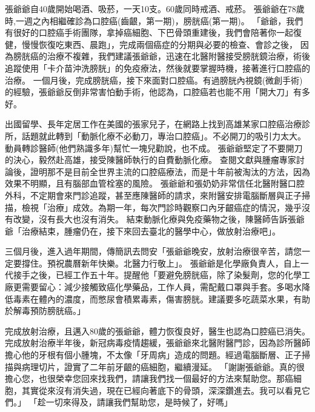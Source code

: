 \documentclass[12pt, a4paper]{article}
\begin{document}
張爺爺自40歲開始喝酒、吸菸，一天10支。60歲同時戒酒、戒菸。
張爺爺在78歲時,一週之內相繼確診為口腔癌(齒齦，第一期)，膀胱癌(第一期)。
「爺爺，我們有很好的口腔癌手術團隊，拿掉癌細胞、下巴骨頭重建後，我們會陪著你一起復健，慢慢恢復吃東西、晨跑」，完成兩個癌症的分期與必要的檢查、會診之後，
因為膀胱癌的治療不複雜，我們建議張爺爺，迅速在北醫附醫接受膀胱鏡治療，術後追蹤使用「卡介苗沖洗膀胱」的免疫療法，然後就要掌握時機，接著進行口腔癌的治療。
一個月後，完成膀胱癌，接下來面對口腔癌。有過膀胱內視鏡(微創手術)的經驗，張爺爺反倒非常害怕動手術，他認為，口腔癌若也能不用「開大刀」有多好。

出國留學、長年定居工作在美國的張家兒子，在網路上找到高雄某家口腔癌治療診所，話題就此轉到「動脈化療不必動刀，專治口腔癌」。不必開刀的吸引力太大。動員轉診醫師(他們熟識多年)幫忙一塊兒勸說，也不成。
張爺爺堅定了不要開刀的決心，毅然赴高雄，接受陳醫師執行的自費動脈化療。
查閱文獻與腫瘤專家討論後，證明那不是目前全世界主流的口腔癌療法，而是十年前被淘汰的方法，因為效果不明顯，且有腦部血管栓塞的風險。
張爺爺和張奶奶非常信任北醫附醫口腔外科，不定期會來門診追蹤，甚至應陳醫師的請求，來附醫安排電腦斷層與正子掃描，檢視「治療」成效。為期一年，每次門診時觀察口內牙齦癌症的情況，幾乎沒有改變，沒有長大也沒有消失。
結束動脈化療與免疫藥物之後，陳醫師告訴張爺爺「治療結束，腫瘤仍在，接下來回去臺北的醫學中心，做放射治療吧」。

三個月後，進入過年期間，傳簡訊去問安「張爺爺晚安，放射治療很辛苦，請您一定要撐住。預祝農曆新年快樂。北醫力行敬上」。
張爺爺是化學廠負責人，自上一代接手之後，已經工作五十年。提醒他「要避免膀胱癌，除了染髮劑，您的化學工廠更需要留心：減少接觸致癌化學藥品，工作人員，需配戴口罩與手套。多喝水降低毒素在體內的濃度，而憋尿會積累毒素，傷害膀胱。建議要多吃蔬菜水果，有助於解毒預防膀胱癌。」

完成放射治療，且邁入80歲的張爺爺，體力恢復良好，醫生也認為口腔癌已消失。
完成放射治療半年後，新冠病毒疫情趨緩，張爺爺來北醫附醫門診，因為診所醫師擔心他的牙根有個小腫塊，不太像「牙周病」造成的問題。經過電腦斷層、正子掃描與病理切片，證實了二年前牙齦的癌細胞，繼續漫延。
「謝謝張爺爺。真的很擔心您，也很榮幸您回來找我們，請讓我們找一個最好的方法來幫助您。那癌細胞，其實從來沒有消失過，現在已經向著底下的骨頭，深深鑽進去。我可以看見它們。」
「趁一切來得及，請讓我們幫助您，是時候了，好嗎」
\end{document}
